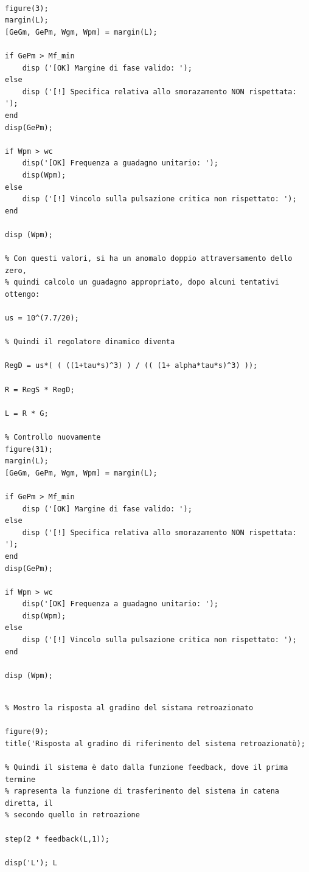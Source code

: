 \documentclass{article}
\begin{document}
\begin{verbatim}

figure(3);
margin(L);
[GeGm, GePm, Wgm, Wpm] = margin(L);

if GePm > Mf_min
    disp ('[OK] Margine di fase valido: ');
else
    disp ('[!] Specifica relativa allo smorazamento NON rispettata: ');
end
disp(GePm);

if Wpm > wc
    disp('[OK] Frequenza a guadagno unitario: ');
    disp(Wpm);
else
    disp ('[!] Vincolo sulla pulsazione critica non rispettato: ');
end

disp (Wpm);

% Con questi valori, si ha un anomalo doppio attraversamento dello zero,
% quindi calcolo un guadagno appropriato, dopo alcuni tentativi ottengo:

us = 10^(7.7/20);

% Quindi il regolatore dinamico diventa

RegD = us*( ( ((1+tau*s)^3) ) / (( (1+ alpha*tau*s)^3) ));

R = RegS * RegD;

L = R * G;

% Controllo nuovamente
figure(31);
margin(L);
[GeGm, GePm, Wgm, Wpm] = margin(L);

if GePm > Mf_min
    disp ('[OK] Margine di fase valido: ');
else
    disp ('[!] Specifica relativa allo smorazamento NON rispettata: ');
end
disp(GePm);

if Wpm > wc
    disp('[OK] Frequenza a guadagno unitario: ');
    disp(Wpm);
else
    disp ('[!] Vincolo sulla pulsazione critica non rispettato: ');
end

disp (Wpm);
\end{verbatim}

\begin{verbatim}

% Mostro la risposta al gradino del sistama retroazionato

figure(9);
title('Risposta al gradino di riferimento del sistema retroazionatò);

% Quindi il sistema è dato dalla funzione feedback, dove il prima termine
% rapresenta la funzione di trasferimento del sistema in catena diretta, il
% secondo quello in retroazione

step(2 * feedback(L,1));

disp('L'); L
\end{verbatim}
\end{document}

